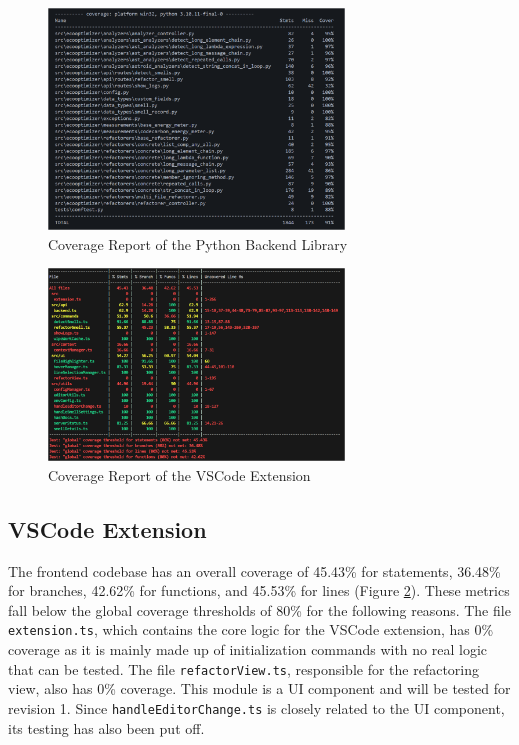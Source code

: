 \documentclass[12pt, titlepage]{article}
\begin{document}
\begin{figure}[H]
  \centering
  \includegraphics[width=0.7\textwidth]{../Images/python-coverage.png}
  \caption{Coverage Report of the Python Backend Library}
  \label{img:python-cov}
\end{figure}

\begin{figure}[H]
  \centering
  \includegraphics[width=0.7\textwidth]{../Images/vscode-coverage.png}
  \caption{Coverage Report of the VSCode Extension}
  \label{img:vscode-cov}
\end{figure}

\subsection{VSCode Extension}
The frontend codebase has an overall coverage of 45.43\% for
statements, 36.48\% for branches, 42.62\% for functions, and 45.53\%
for lines (Figure \ref{img:vscode-cov}). These metrics fall below the
global coverage thresholds of 80\% for the following reasons. The
file \texttt{extension.ts}, which contains the core logic for the
VSCode extension, has 0\% coverage as it is mainly made up of
initialization commands with no real logic that can be tested. The
file \texttt{refactorView.ts}, responsible for the refactoring view,
also has 0\% coverage. This module is a UI component and will be
tested for revision 1. Since \texttt{handleEditorChange.ts} is
closely related to the UI component, its testing has also been put off.\\
\end{document}
